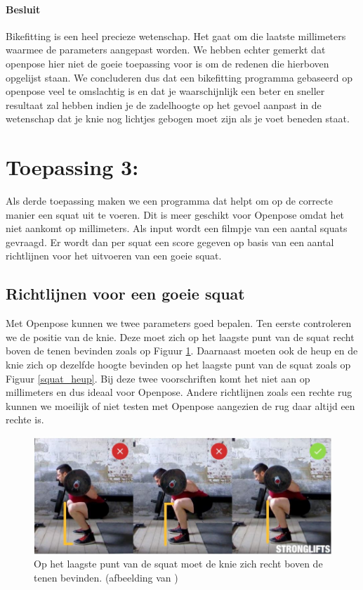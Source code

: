 \documentclass[a4paper,twoside,kulak]{kulakreport}
\begin{document}
\paragraph{Besluit}
Bikefitting is een heel precieze wetenschap. Het gaat om die laatste millimeters waarmee de parameters aangepast worden. We hebben echter gemerkt dat openpose hier niet de goeie toepassing voor is om de redenen die hierboven opgelijst staan. We concluderen dus dat een bikefitting programma gebaseerd op openpose veel te omslachtig is en dat je waarschijnlijk een beter en sneller resultaat zal hebben indien je de zadelhoogte op het gevoel aanpast in de wetenschap dat je knie nog lichtjes gebogen moet zijn als je voet beneden staat.


\section{Toepassing 3: }

Als derde toepassing maken we een programma dat helpt om op de correcte manier een squat uit te voeren. Dit is meer geschikt voor Openpose omdat het niet aankomt op millimeters. Als input wordt een filmpje van een aantal squats gevraagd. Er wordt dan per squat een score gegeven op basis van een aantal richtlijnen voor het uitvoeren van een goeie squat.\cite{squats} 

\subsection{Richtlijnen voor een goeie squat}

Met Openpose kunnen we twee parameters goed bepalen.
Ten eerste controleren we de positie van de knie. Deze moet zich op het laagste punt van de squat recht boven de tenen bevinden zoals op Figuur \ref{squat_knie}. Daarnaast moeten ook de heup en de knie zich op dezelfde hoogte bevinden op het laagste punt van de squat zoals op Figuur \ref{squat_heup}. Bij deze twee voorschriften komt het niet aan op millimeters en dus ideaal voor Openpose. Andere richtlijnen zoals een rechte rug kunnen we moeilijk of niet testen met Openpose aangezien de rug daar altijd een rechte is.

\begin{figure}[H]
	\includegraphics[width= \textwidth]{squat_knie}
	\caption{Op het laagste punt van de squat moet de knie zich recht boven de tenen bevinden. (afbeelding van \cite{squats})}
	\label{squat_knie}
\end{figure}
\end{document}
